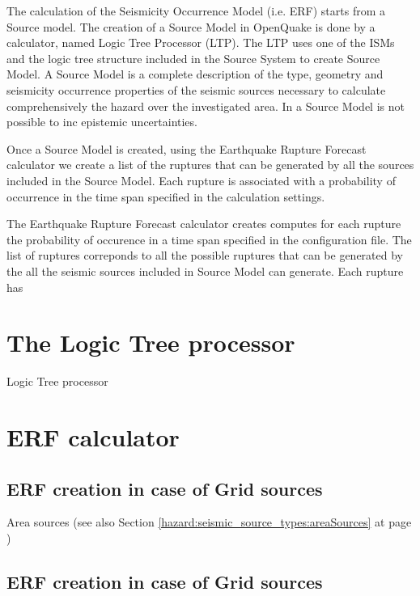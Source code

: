 %
The calculation of the Seismicity Occurrence Model (i.e. ERF) starts from a Source model. 
%
The creation of a Source Model in OpenQuake is done by a calculator, named Logic Tree Processor (LTP). The LTP uses one of the ISMs and the logic tree structure included in the Source System to create Source Model.
%
A Source Model is a complete description of the type, geometry and seismicity occurrence properties of the seismic sources necessary to calculate comprehensively the hazard over the investigated area. In a Source Model is not possible to inc epistemic uncertainties.

Once a Source Model is created, using the Earthquake Rupture Forecast calculator we create a list of the ruptures that can be generated by all the sources included in the Source Model. Each rupture is associated with a probability of occurrence in the time span specified in the calculation settings. 
 

The Earthquake Rupture Forecast calculator creates  computes for each rupture the probability of occurence in a time span specified in the configuration file.
The list of ruptures correponds to all the possible ruptures that can be generated by the all the seismic sources included in Source Model can generate.
%
Each rupture has 


%
\section{The Logic Tree processor}
Logic Tree processor

%
\section{ERF calculator}

%
\subsection{ERF creation in case of Grid sources}
Area sources (see also Section \ref{hazard:seismic_source_types:areaSources} 
at page \pageref{hazard:seismic_source_types:areaSources}) 

%
\subsection{ERF creation in case of Grid sources}


